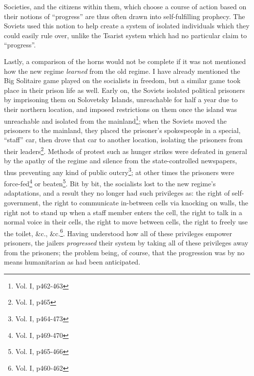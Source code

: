 \documentclass{article}
\begin{document}
Societies, and the citizens within them, which choose a course of action based on their notions of ``progress'' are thus often drawn into self-fulfilling prophecy.  The Soviets used this notion to help create a system of isolated individuals which they could easily rule over, unlike the Tsarist system which had no particular claim to ``progress''.

Lastly, a comparison of the horns would not be complete if it was not mentioned how the new regime \emph{learned} from the old regime.  I have already mentioned the Big Solitaire game played on the socialists in freedom, but a similar game took place in their prison life as well.  Early on, the Soviets isolated political prisoners by imprisoning them on Solovetsky Islands, unreachable for half a year due to their northern location, and imposed restrictions on them once the island was unreachable and isolated from the mainland\footnote{Vol. I, p462-463}; when the Soviets moved the prisoners to the mainland, they placed the prisoner's spokespeople in a special, ``staff'' car, then drove that car to another location, isolating the prisoners from their leaders\footnote{Vol. I, p465}.  Methods of protest such as hunger strikes were defeated in general by the apathy of the regime and silence from the state-controlled newspapers, thus preventing any kind of public outcry\footnote{Vol. I, p464-473}; at other times the prisoners were force-fed\footnote{Vol. I, p469-470} or beaten\footnote{Vol. I, p465-466}.  Bit by bit, the socialists lost to the new regime's adaptations, and a result they no longer had such privileges as: the right of self-government, the right to communicate in-between cells via knocking on walls, the right not to stand up when a staff member enters the cell, the right to talk in a normal voice in their cells, the right to move between cells, the right to freely use the toilet, \&c., \&c.\footnote{Vol. I, p460-462}.  Having understood how all of these privileges empower prisoners, the jailers \emph{progressed} their system by taking all of these privileges away from the prisoners; the problem being, of course, that the progression was by no means humanitarian as had been anticipated.
\end{document}
